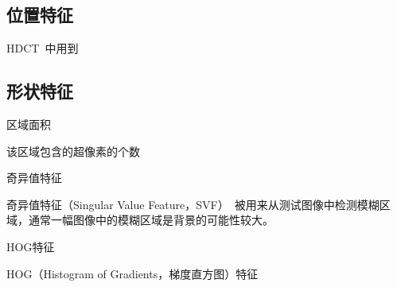 \documentclass[12pt]{article}
\begin{document}
\subsection{位置特征}

HDCT~\cite{kim2014salient}中用到

\subsection{形状特征}

区域面积

该区域包含的超像素的个数

奇异值特征

奇异值特征（Singular Value Feature，SVF）~\cite{su2011blurred}被用来从测试图像中检测模糊区域，通常一幅图像中的模糊区域是背景的可能性较大。

HOG特征

HOG（Histogram of Gradients，梯度直方图）特征~\cite{felzenszwalb2010object}
















%


\end{document}
